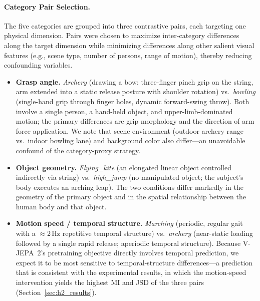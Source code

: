 \documentclass{article}
\begin{document}
\paragraph{Category Pair Selection.}
The five categories are grouped into three contrastive pairs, each targeting one
physical dimension.  Pairs were chosen to maximize inter-category differences
along the target dimension while minimizing differences along other salient
visual features (e.g., scene type, number of persons, range of motion), thereby
reducing confounding variables.

\begin{itemize}
  \item \textbf{Grasp angle.}
    \textit{Archery} (drawing a bow: three-finger pinch grip on the string,
    arm extended into a static release posture with shoulder rotation)
    vs.\ \textit{bowling} (single-hand grip through finger holes, dynamic
    forward-swing throw).
    Both involve a single person, a hand-held object, and upper-limb-dominated
    motion; the primary differences are grip morphology and the direction of
    arm force application.  We note that scene environment (outdoor archery
    range vs.\ indoor bowling lane) and background color also differ---an
    unavoidable confound of the category-proxy strategy.

  \item \textbf{Object geometry.}
    \textit{Flying\_kite} (an elongated linear object controlled indirectly via
    string) vs.\ \textit{high\_jump} (no manipulated object; the subject's body
    executes an arching leap).
    The two conditions differ markedly in the geometry of the primary object and
    in the spatial relationship between the human body and that object.

  \item \textbf{Motion speed / temporal structure.}
    \textit{Marching} (periodic, regular gait with a $\approx$2\,Hz repetitive
    temporal structure) vs.\ \textit{archery} (near-static loading followed by a
    single rapid release; aperiodic temporal structure).
    Because V-JEPA~2's pretraining objective directly involves temporal
    prediction, we expect it to be most sensitive to temporal-structure
    differences---a prediction that is consistent with the experimental results,
    in which the motion-speed intervention yields the highest MI and JSD of the
    three pairs (Section~\ref{sec:h2_results}).
\end{itemize}
\end{document}
